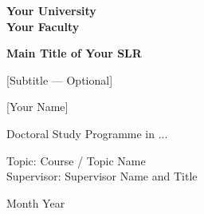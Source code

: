 \documentclass[a4paper,12pt]{article}
\begin{document}
\begin{titlepage}
  \centering
  \vspace*{2cm}
  {\Large\bfseries Your University\\
   Your Faculty\par}
  \vspace{2cm}

  {\LARGE\bfseries Main Title of Your SLR\par}
  \vspace{1.5cm}
  {\large [Subtitle — Optional]\par}
  \vspace{2.5cm}
  {\large [Your Name]\par}
  \vspace{0.3cm}
  {\normalsize Doctoral Study Programme in ...\par}
  \vspace{0.7cm}
  {\normalsize
    Topic: Course / Topic Name\\
    Supervisor: Supervisor Name and Title\par}
  \vspace{1cm}
  {\normalsize Month Year\par}
\end{titlepage}



\newpage
\tableofcontents
\newpage


\newpage

\newpage

\newpage

\newpage

\newpage

\newpage

\newpage

\newpage

\newpage


\newpage


\newpage
\begin{appendices}

\end{appendices}
\end{document}
